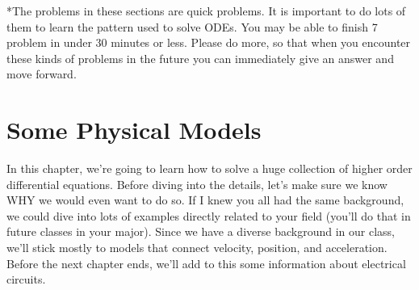 *The problems in these sections are quick problems. It is important to do lots of them to learn the pattern used to solve ODEs. You may be able to finish 7 problem in under 30 minutes or less.  Please do more, so that when you encounter these kinds of problems in the future you can immediately give an answer and move forward.


\section{Some Physical Models}
In this chapter, we're going to learn how to solve a huge collection of higher order differential equations.  Before diving into the details, let's make sure we know WHY we would even want to do so. If I knew you all had the same background, we could dive into lots of examples directly related to your field (you'll do that in future classes in your major).  Since we have a diverse background in our class, we'll stick mostly to models that connect velocity, position, and acceleration.  Before the next chapter ends, we'll add to this some information about electrical circuits.  

